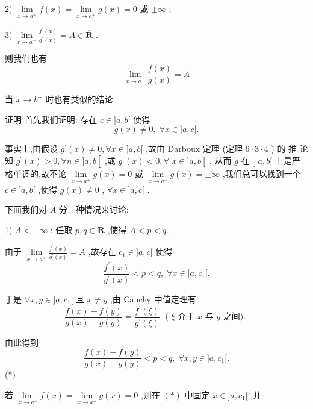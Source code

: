 2) $\mathop{\lim }\limits_{{x \rightarrow  {a}^{ + }}}f\left( x\right)  = \mathop{\lim }\limits_{{x \rightarrow  {a}^{ + }}}g\left( x\right)  = 0$ 或 $\pm  \infty$ ;

3) $\mathop{\lim }\limits_{{r \rightarrow  {a}^{ + }}}\frac{{f}^{\prime }\left( x\right) }{{g}^{\prime }\left( x\right) } = A \in  \overline{\mathbf{R}}$ .

则我们也有
$$\mathop{\lim }\limits_{{x \rightarrow  {a}^{ + }}}\frac{f\left( x\right) }{g\left( x\right) } = A$$

当 $x \rightarrow  {b}^{ - }$ 时也有类似的结论.

证明 首先我们证明: 存在 $c \in  \rbrack a,b\lbrack$ 使得
$$g\left( x\right)  \neq  0,\;\forall x \in  \rbrack a,c\lbrack .$$

事实上,由假设 ${g}^{\prime }\left( x\right)  \neq  0,\forall x \in  \rbrack a,b\lbrack$ ,故由 Darboux 定理 (定理 $6 \cdot  3 \cdot  4$ ) 的 推 论知 ${g}^{\prime }\left( x\right)  > 0,\forall n \in  \rbrack a,b\left\lbrack  \right.$ ,或 ${g}^{\prime }\left( x\right)  < 0,\forall$  $x \in  \rbrack a,b\left\lbrack  {\text{ . 从而 }g\text{ 在 }}\right\rbrack  a,b\lbrack$ 上是严格单调的,故不论 $\mathop{\lim }\limits_{{x \rightarrow  {a}^{ + }}}g\left( x\right)  = 0$ 或 $\mathop{\lim }\limits_{{x \rightarrow  {a}^{ + }}}g\left( x\right)  =  \pm  \infty$ ,我们总可以找到一个 $c \in  \rbrack a,b\lbrack$ ,使得 $g\left( x\right)  \neq  0$ , $\forall x \in  \rbrack a,c\lbrack$ .

下面我们对 $A$ 分三种情况来讨论:

1) $A <  + \infty$ : 任取 $p,q \in  \mathbf{R}$ ,使得 $A < p < q$ .

由于 $\mathop{\lim }\limits_{{x \rightarrow  {a}^{ + }}}\frac{{f}^{\prime }\left( x\right) }{{g}^{\prime }\left( x\right) } = A$ ,故存在 ${c}_{1} \in  \rbrack a,c\lbrack$ 使得
$$\frac{{f}^{\prime }\left( x\right) }{{g}^{\prime }\left( x\right) } < p < q,\;\forall x \in  \rbrack a,{c}_{1}\lbrack .$$

于是 $\forall x,y \in  \rbrack a,{c}_{1}\lbrack$ 且 $x \neq  y$ ,由 Cauchy 中值定理有
$$\frac{f\left( x\right)  - f\left( y\right) }{g\left( x\right)  - g\left( y\right) } = \frac{{f}^{\prime }\left( \xi \right) }{{g}^{\prime }\left( \xi \right) }\;\text{ ( }\xi \text{ 介于 }x\text{ 与 }y\text{ 之间). }$$

由此得到
$$\frac{f\left( x\right)  - f\left( y\right) }{g\left( x\right)  - g\left( y\right) } < p < q,\;\forall x,y \in  \rbrack a,{c}_{1}\lbrack .$$
(*)

若 $\mathop{\lim }\limits_{{x \rightarrow  {a}^{ + }}}f\left( x\right)  = \mathop{\lim }\limits_{{x \rightarrow  {a}^{ + }}}g\left( x\right)  = 0$ ,则在 $\left( *\right)$ 中固定 $x \in  \rbrack a,{c}_{1}\lbrack$ ,并

